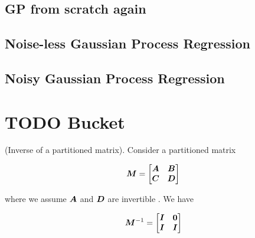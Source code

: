 \section{GP from scratch again}



\section{Noise-less Gaussian Process Regression}

\section{Noisy Gaussian Process Regression}


\chapter{TODO Bucket}


\begin{thm} (Inverse of a partitioned matrix). Consider a partitioned matrix

\begin{equation}
{\bm{M}} = \begin{bmatrix} {\bm{A}} & {\bm{B}} \\ {\bm{C}} & {\bm{D}} \end{bmatrix}
\end{equation}

where we assume ${\bm{A}}$ and ${\bm{D}}$ are invertible . We have

\begin{equation}
{\bm{M}}^{-1} = \begin{bmatrix} {\bm{I}} & {\bm{0}} \\ {\bm{I}} & {\bm{I}} \end{bmatrix}
\end{equation}
\end{thm}

